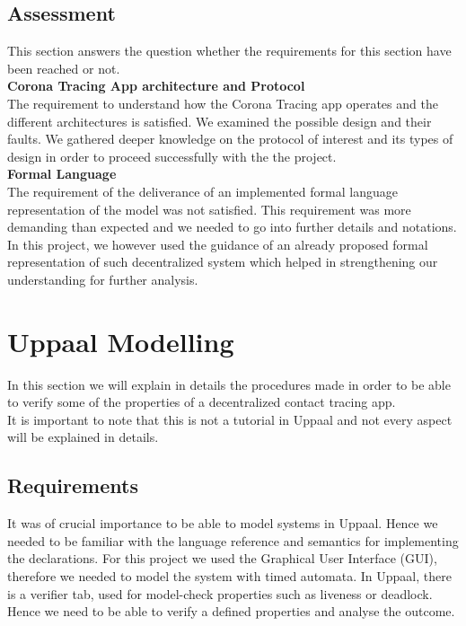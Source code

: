 \documentclass[a4paper, twocolumn]{article}
\begin{document}
\subsection{Assessment}
This section answers the question whether the requirements for this section have been reached or not.\\

\noindent \textbf{Corona Tracing App architecture and Protocol}\\
The requirement to understand how the Corona Tracing app operates and the different architectures is satisfied. We examined the possible design and their faults. We gathered deeper knowledge on the protocol of interest and its types of design in order to proceed successfully with the the project.\\

\noindent \textbf{Formal Language}\\
The requirement of the deliverance of an implemented formal language representation of the model was not satisfied. This requirement was more demanding than expected and we needed to go into further details and notations. In this project, we however used the guidance of an already proposed formal representation of such decentralized system which helped in strengthening our understanding for further analysis.

\section{ Uppaal Modelling}
In this section we will explain in details the procedures made in order to be able to verify some of the properties of a decentralized contact tracing app.\\
It is important to note that this is not a tutorial in Uppaal and not every aspect will be explained in details.
\label{sec-production}

\subsection{Requirements}
It was of crucial importance to be able to model systems in Uppaal. Hence we needed to be familiar with the language reference and semantics for implementing the declarations. For this project we used the Graphical User Interface (GUI), therefore we needed to model the system with timed automata. In Uppaal, there is a verifier tab, used for model-check properties such as liveness or deadlock. Hence we need to be able to verify a defined properties and analyse the outcome.
\end{document}

